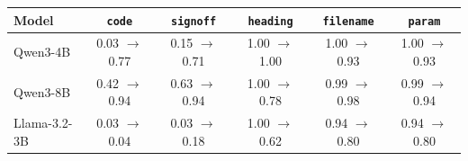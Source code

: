\begin{tabular}{lccccc}
\toprule
Model & \texttt{code} & \texttt{signoff} & \texttt{heading} & \texttt{filename} & \texttt{param} \\
\midrule
Qwen3-4B & 0.03 $\rightarrow$ 0.77 & 0.15 $\rightarrow$ 0.71 & 1.00 $\rightarrow$ 1.00 & 1.00 $\rightarrow$ 0.93 & 1.00 $\rightarrow$ 0.93 \\
Qwen3-8B & 0.42 $\rightarrow$ 0.94 & 0.63 $\rightarrow$ 0.94 & 1.00 $\rightarrow$ 0.78 & 0.99 $\rightarrow$ 0.98 & 0.99 $\rightarrow$ 0.94 \\
Llama-3.2-3B & 0.03 $\rightarrow$ 0.04 & 0.03 $\rightarrow$ 0.18 & 1.00 $\rightarrow$ 0.62 & 0.94 $\rightarrow$ 0.80 & 0.94 $\rightarrow$ 0.80 \\
\bottomrule
\end{tabular}

